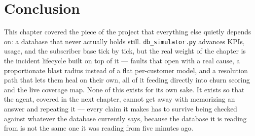 \section*{Conclusion}

This chapter covered the piece of the project that everything else
quietly depends on: a database that never actually holds still.
\texttt{db\_simulator.py} advances KPIs, usage, and the subscriber base
tick by tick, but the real weight of the chapter is the incident
lifecycle built on top of it --- faults that open with a real cause, a
proportionate blast radius instead of a flat per-customer model, and a
resolution path that lets them heal on their own, all of it feeding
directly into churn scoring and the live coverage map. None of this
exists for its own sake. It exists so that the agent, covered in the
next chapter, cannot get away with memorizing an answer and repeating
it --- every claim it makes has to survive being checked against
whatever the database currently says, because the database it is
reading from is not the same one it was reading from five minutes ago.
